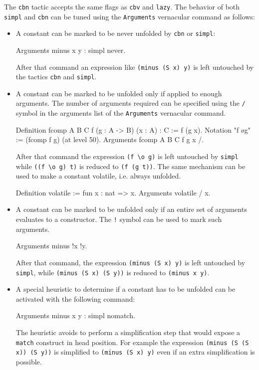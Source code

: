 \begin{coq_example*}
The \texttt{cbn} tactic accepts the same flags as \texttt{cbv} and
\texttt{lazy}.  The behavior of both \texttt{simpl} and \texttt{cbn}
can be tuned using the \texttt{Arguments} vernacular command as
follows: 
\begin{itemize}
\item
A constant can be marked to be never unfolded by \texttt{cbn} or
\texttt{simpl}:
\begin{coq_example*}
Arguments minus x y : simpl never.
\end{coq_example*}
After that command an expression like \texttt{(minus (S x) y)} is left
untouched by the tactics \texttt{cbn} and \texttt{simpl}.
\item
A constant can be marked to be unfolded only if applied to enough arguments.
The number of arguments required can be specified using
the {\tt /} symbol in the arguments list of the {\tt Arguments} vernacular
command.
\begin{coq_example*}
Definition fcomp A B C f (g : A -> B) (x : A) : C := f (g x).
Notation "f \o g" := (fcomp f g) (at level 50).
Arguments fcomp {A B C} f g x /.
\end{coq_example*}
After that command the expression {\tt (f \verb+\+o g)} is left untouched by
{\tt simpl} while {\tt ((f \verb+\+o g) t)} is reduced to {\tt (f (g t))}.
The same mechanism can be used to make a constant volatile, i.e. always
unfolded.
\begin{coq_example*}
Definition volatile := fun x : nat => x.
Arguments volatile / x.
\end{coq_example*}
\item
A constant can be marked to be unfolded only if an entire set of arguments
evaluates to a constructor. The {\tt !} symbol can be used to mark such
arguments.
\begin{coq_example*}
Arguments minus !x !y.
\end{coq_example*}
After that command, the expression {\tt (minus (S x) y)} is left untouched by
{\tt simpl}, while {\tt (minus (S x) (S y))} is reduced to {\tt (minus x y)}.
\item
A special heuristic to determine if a constant has to be unfolded can be
activated with the following command:
\begin{coq_example*}
Arguments minus x y : simpl nomatch.
\end{coq_example*}
The heuristic avoids to perform a simplification step that would
expose a {\tt match} construct in head position. For example the
expression {\tt (minus (S (S x)) (S y))} is simplified to
{\tt (minus (S x) y)} even if an extra simplification is possible.
\end{itemize}


\end{coq_example*}
